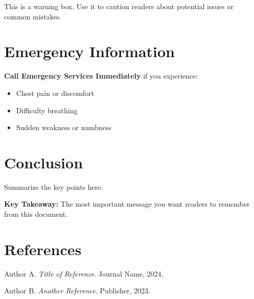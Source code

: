 \documentclass[11pt, a4paper]{article}
\begin{document}
\begin{warningbox}
    This is a warning box. Use it to caution readers about potential issues or common mistakes.
\end{warningbox}

\section{Emergency Information}

\begin{alertbox}
    \textbf{Call Emergency Services Immediately} if you experience:
    \begin{itemize}[label=\textcolor{BrandAlert}{\faExclamationCircle}]
        \item Chest pain or discomfort
        \item Difficulty breathing
        \item Sudden weakness or numbness
    \end{itemize}
\end{alertbox}

\section{Conclusion}

Summarize the key points here.

\begin{keypoint}
    \textbf{Key Takeaway:} The most important message you want readers to remember from this document.
\end{keypoint}

\section*{References}
\begin{enumerate}[label={[\arabic*]}]
    \item Author A. \textit{Title of Reference}. Journal Name, 2024.
    \item Author B. \textit{Another Reference}. Publisher, 2023.
\end{enumerate}
\end{document}

